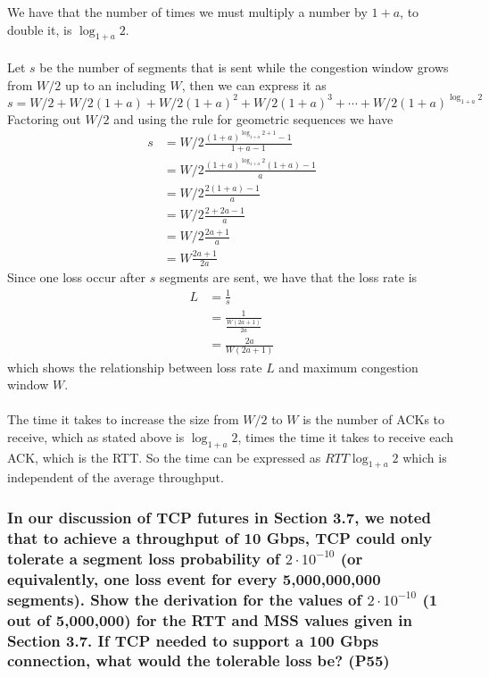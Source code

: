 We have that the number of times we must multiply a number by $1+a$, to double it, is $\log_{1+a}2$. \\
\\
Let $s$ be the number of segments that is sent while the congestion window grows from $W/2$ up to an including $W$, then we can express it as
\begin{equation*}
  s = W/2 + W/2 (1+a) + W/2 (1+a)^2 + W/2 (1+a)^3 + \cdots + W/2 (1+a)^{\log_{1+a} 2}
\end{equation*}
Factoring out $W/2$ and using the rule for geometric sequences we have
\begin{equation*}
  \begin{split}
    s &= W/2 \frac{(1+a)^{\log_{1+a} 2 + 1} - 1}{1 + a - 1} \\
      &= W/2 \frac{(1+a)^{\log_{1+a} 2} (1+a) - 1}{a} \\
      &= W/2 \frac{2(1+a) - 1}{a} \\
      &= W/2 \frac{2 + 2a - 1}{a} \\
      &= W/2 \frac{2a + 1}{a} \\
      &= W \frac{2a + 1}{2a}
  \end{split}
\end{equation*}
Since one loss occur after $s$ segments are sent, we have that the loss rate is
\begin{equation*}
  \begin{split}
    L &= \frac{1}{s} \\
      &= \frac{1}{\frac{W(2a + 1)}{2a}} \\
      &= \frac{2a}{W(2a + 1)}
  \end{split}
\end{equation*}
which shows the relationship between loss rate $L$ and maximum congestion window $W$. \\
\\
The time it takes to increase the size from $W/2$ to $W$ is the number of ACKs to receive, which as stated above is $\log_{1+a}2$, times the time it takes to receive each ACK, which is the RTT. So the time can be expressed as $RTT \log_{1+a}2$ which is independent of the average throughput.


\subsubsection{In our discussion of TCP futures in Section 3.7, we noted that to achieve a throughput of 10 Gbps, TCP could only tolerate a segment loss probability of $2 \cdot 10^{-10}$ (or equivalently, one loss event for every 5,000,000,000 segments). Show the derivation for the values of $2 \cdot 10^{-10}$ (1 out of 5,000,000) for the RTT and MSS values given in Section 3.7. If TCP needed to support a  100 Gbps connection, what would the tolerable loss be? (P55)}


